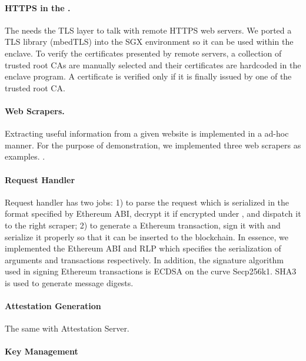 \paragraph{HTTPS in the \encname.} 
The \encname needs the TLS layer to talk with remote HTTPS web servers.  We
ported a TLS library (mbedTLS) into the SGX environment so it can be used within
the enclave.  To verify the certificates presented by remote servers, a
collection of trusted root CAs are manually selected  and their
certificates are hardcoded in the enclave program. A certificate is verified
only if it is finally issued by one of the trusted root CA.

\paragraph{Web Scrapers.} Extracting useful information from a given website is
implemented in a ad-hoc manner. For the purpose of demonstration, we implemented
three web scrapers as examples. .

\paragraph{Request Handler} Request handler has two jobs: 1) to parse the
request which is serialized in the format specified by Ethereum ABI, decrypt it if encrypted under
\pkTC, and dispatch it to the right scraper; 2) to generate a Ethereum
transaction, sign it with \pkTC and serialize it properly so that it can be
inserted to the blockchain. In essence, we implemented the Ethereum ABI and RLP which
specifies the serialization of arguments and transactions respectively.
In addition, the signature algorithm used in signing Ethereum transactions is
ECDSA on the curve Secp256k1. SHA3 is used to generate message digests.

\paragraph{Attestation Generation} The same with Attestation Server.
\paragraph{Key Management} 
